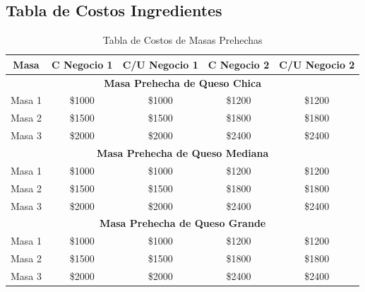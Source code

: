 \documentclass[12pt]{article}
\begin{document}
\subsection{Tabla de Costos Ingredientes}

\begin{table}[h!]
    \centering
    \begin{tabular}{|| c | c | c | c | c||} %
        \hline
        \textbf{Masa} & \textbf{C Negocio 1} & \textbf{C/U Negocio 1} & \textbf{C Negocio 2} & \textbf{C/U Negocio 2} \\ [0.5ex]
        \hline\hline

        \multicolumn{5}{||c||}{\textbf{Masa Prehecha de Queso Chica}} \\ [0.5ex] \hline \hline
        Masa 1 & \$1000 & \$1000 & \$1200 & \$1200 \\ \hline
        Masa 2 & \$1500 & \$1500 & \$1800 & \$1800 \\ \hline
        Masa 3 & \$2000 & \$2000 & \$2400 & \$2400 \\ [1ex] \hline \hline

        \multicolumn{5}{||c||}{\textbf{Masa Prehecha de Queso Mediana}} \\ [0.5ex] \hline \hline
        Masa 1 & \$1000 & \$1000 & \$1200 & \$1200 \\ \hline
        Masa 2 & \$1500 & \$1500 & \$1800 & \$1800 \\ \hline
        Masa 3 & \$2000 & \$2000 & \$2400 & \$2400 \\ [1ex] \hline \hline

        \multicolumn{5}{||c||}{\textbf{Masa Prehecha de Queso Grande}} \\ [0.5ex] \hline \hline
        Masa 1 & \$1000 & \$1000 & \$1200 & \$1200 \\ \hline
        Masa 2 & \$1500 & \$1500 & \$1800 & \$1800 \\ \hline
        Masa 3 & \$2000 & \$2000 & \$2400 & \$2400 \\ [1ex] \hline \hline

    \end{tabular}
    \caption{Tabla de Costos de Masas Prehechas}
    \label{tab:costos_masas}
\end{table}
\end{document}
